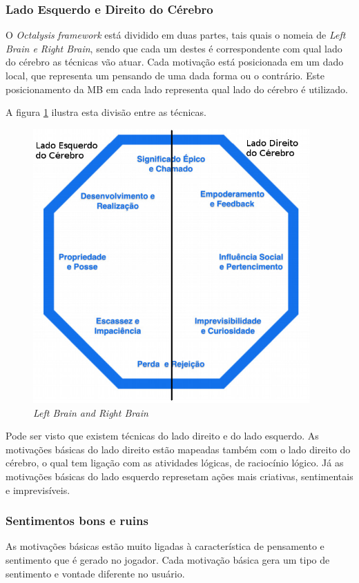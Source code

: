 \subsubsection{Lado Esquerdo e Direito do Cérebro}
\label{sub:leftright}
O \textit{Octalysis} \textit{framework} está dividido em duas partes, tais quais o \cite{chou2015actionable} nomeia
de \textit{Left Brain e Right Brain}, sendo que cada um destes é correspondente com qual lado do cérebro
as técnicas vão atuar. Cada motivação está posicionada em um dado local, que
representa um pensando de uma dada forma ou o contrário. Este posicionamento
da MB em cada lado representa qual lado do cérebro é utilizado.

A figura \ref{fig:octalysisleftright} ilustra esta divisão entre as técnicas.

\begin{figure}[h]
    \centering
    \includegraphics[width=400px, scale=1]{figuras/octalysisleftright}
    \caption{\textit{Left Brain and Right Brain}}
    \label{fig:octalysisleftright}
\end{figure}

Pode ser visto que existem técnicas do lado direito e do lado esquerdo. As
motivações básicas do lado direito estão mapeadas também com o lado direito
do cérebro, o qual tem ligação com as atividades lógicas, de raciocínio lógico.
Já as motivações básicas do lado esquerdo represetam ações mais criativas,
sentimentais e imprevisíveis.

\subsubsection{Sentimentos bons e ruins}
\label{sub:whiteblack}
As motivações básicas estão muito ligadas à característica de pensamento e
sentimento que é gerado no jogador. Cada motivação básica gera um tipo de
sentimento e vontade diferente no usuário.


